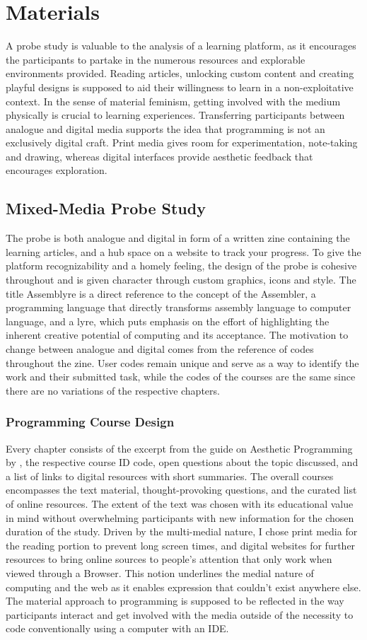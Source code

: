 \section{Materials}
A probe study is valuable to the analysis of a learning platform, as it encourages the participants to partake in the numerous resources and explorable environments provided. Reading articles, unlocking custom content and creating playful designs is supposed to aid their willingness to learn in a non-exploitative context. In the sense of material feminism, getting involved with the medium physically is crucial to learning experiences. Transferring participants between analogue and digital media supports the idea that programming is not an exclusively digital craft. Print media gives room for experimentation, note-taking and drawing, whereas digital interfaces provide aesthetic feedback that encourages exploration.
\subsection{Mixed-Media Probe Study}
The probe is both analogue and digital in form of a written zine containing the learning articles, and a hub space on a website to track your progress. To give the platform recognizability and a homely feeling, the design of the probe is cohesive throughout and is given character through custom graphics, icons and style. The title Assemblyre is a direct reference to the concept of the Assembler, a programming language that directly transforms assembly language to computer language, and a lyre, which puts emphasis on the effort of highlighting the inherent creative potential of computing and its acceptance. The motivation to change between analogue and digital comes from the reference of codes throughout the zine. User codes remain unique and serve as a way to identify the work and their submitted task, while the codes of the courses are the same since there are no variations of the respective chapters.
\subsubsection{Programming Course Design}
Every chapter consists of the excerpt from the guide on Aesthetic Programming by \cite{soon:2020}, the respective course ID code, open questions about the topic discussed, and a list of links to digital resources with short summaries. The overall courses encompasses the text material, thought-provoking questions, and the curated list of online resources. The extent of the text was chosen with its educational value in mind without overwhelming participants with new information for the chosen duration of the study. Driven by the multi-medial nature, I chose print media for the reading portion to prevent long screen times, and digital websites for further resources to bring online sources to people's attention that only work when viewed through a Browser. This notion underlines the medial nature of computing and the web as it enables expression that couldn't exist anywhere else. The material approach to programming is supposed to be reflected in the way participants interact and get involved with the media outside of the necessity to code conventionally using a computer with an IDE.
